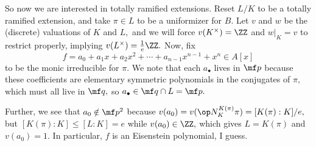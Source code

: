 \documentclass[../notes.tex]{subfiles}
\begin{document}
So now we are interested in totally ramified extensions. Reset $L/K$ to be a totally ramified extension, and take $\pi\in L$ to be a uniformizer for $B.$ Let $v$ and $w$ be the (discrete) valuations of $K$ and $L,$ and we will force $v(K^\times)=\ZZ$ and $w|_K=v$ to restrict properly, implying $v(L^\times)=\frac1e\ZZ.$ Now, fix
\[f=a_0+a_1x+a_2x^2+\cdots+a_{n-1}x^{n-1}+x^n\in A[x]\]
to be the monic irreducible for $\pi.$ We note that each $a_\bullet$ lives in $\mf p$ because these coefficients are elementary symmetric polynomials in the conjugates of $\pi,$ which must all live in $\mf q,$ so $a_\bullet\in\mf q\cap L=\mf p.$

Further, we see that $a_0\notin\mf p^2$ because $v(a_0)=v(\op N_K^{K(\pi)}\pi)=[K(\pi):K]/e,$ but $[K(\pi):K]\le[L:K]=e$ while $v(a_0)\in\ZZ,$ which gives $L=K(\pi)$ and $v(a_0)=1.$ In particular, $f$ is an Eisenstein polynomial, I guess.
\end{document}

